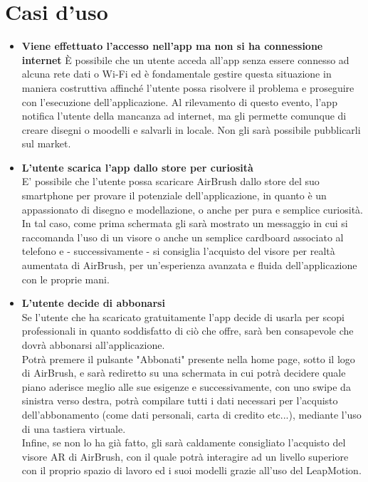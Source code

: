 \documentclass[11pt,fleqn]{book} %
\begin{document}
\section{Casi d'uso}
\begin{itemize}
\item\textbf{Viene effettuato l'accesso nell'app ma non si ha connessione internet}
È possibile che un utente acceda all'app senza essere connesso ad alcuna rete dati
o Wi-Fi ed è fondamentale gestire questa situazione in maniera costruttiva affinché
l'utente possa risolvere il problema e proseguire con l'esecuzione dell'applicazione. Al rilevamento di questo evento, l'app notifica l'utente della mancanza ad internet, ma gli permette comunque di creare disegni o moodelli e salvarli in locale. Non gli sarà possibile pubblicarli sul market.

\item\textbf{L'utente scarica l'app dallo store per curiosità}\\
E' possibile che l'utente possa scaricare AirBrush dallo store del suo smartphone per provare il potenziale dell'applicazione, in quanto è un appassionato di disegno e modellazione, o anche per pura e semplice curiosità.\\
In tal caso, come prima schermata gli sarà mostrato un messaggio in cui si raccomanda l'uso di un visore o anche un semplice cardboard associato al telefono e - successivamente - si consiglia l'acquisto del visore per realtà aumentata di AirBrush, per un'esperienza avanzata e fluida dell'applicazione con le proprie mani.
\item\textbf{L'utente decide di abbonarsi}\\
Se l'utente che ha scaricato gratuitamente l'app decide di usarla per scopi professionali in quanto soddisfatto di ciò che offre, sarà ben consapevole che dovrà abbonarsi all'applicazione.\\
Potrà premere il pulsante "Abbonati" presente nella home page, sotto il logo di AirBrush, e sarà rediretto su una schermata in cui potrà decidere quale piano aderisce meglio alle sue esigenze e successivamente, con uno swipe da sinistra verso destra, potrà compilare tutti i dati necessari per l'acquisto dell'abbonamento (come dati personali, carta di credito etc...), mediante l'uso di una tastiera virtuale.\\
Infine, se non lo ha già fatto, gli sarà caldamente consigliato l'acquisto del visore AR di AirBrush, con il quale potrà interagire ad un livello superiore con il proprio spazio di lavoro ed i suoi modelli grazie all'uso del LeapMotion.

\end{itemize}
\end{document}
